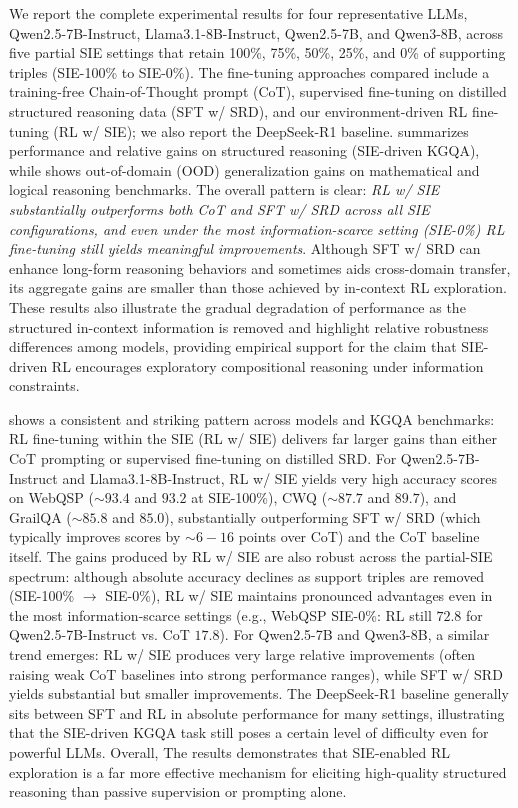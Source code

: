\documentclass{article} %
\begin{document}
\label{appdx:b}
We report the complete experimental results for four representative LLMs, Qwen2.5-7B-Instruct, Llama3.1-8B-Instruct, Qwen2.5-7B, and Qwen3-8B, across five partial SIE settings that retain 100\%, 75\%, 50\%, 25\%, and 0\% of supporting triples (SIE-100\% to SIE-0\%). The fine-tuning approaches compared include a training-free Chain-of-Thought prompt (CoT), supervised fine-tuning on distilled structured reasoning data (SFT w/ SRD), and our environment-driven RL fine-tuning (RL w/ SIE); we also report the DeepSeek-R1 baseline.  summarizes performance and relative gains on structured reasoning (SIE-driven KGQA), while  shows out-of-domain (OOD) generalization gains on mathematical and logical reasoning benchmarks. The overall pattern is clear: \textit{RL w/ SIE substantially outperforms both CoT and SFT w/ SRD across all SIE configurations, and even under the most information-scarce setting (SIE-0\%) RL fine-tuning still yields meaningful improvements}. Although SFT w/ SRD can enhance long-form reasoning behaviors and sometimes aids cross-domain transfer, its aggregate gains are smaller than those achieved by in-context RL exploration. These results also illustrate the gradual degradation of performance as the structured in-context information is removed and highlight relative robustness differences among models, providing empirical support for the claim that SIE-driven RL encourages exploratory compositional reasoning under information constraints.

 shows a consistent and striking pattern across models and KGQA benchmarks: RL fine-tuning within the SIE (RL w/ SIE) delivers far larger gains than either CoT prompting or supervised fine-tuning on distilled SRD. For Qwen2.5-7B-Instruct and Llama3.1-8B-Instruct, RL w/ SIE yields very high accuracy scores on WebQSP ($\sim 93.4$ and $93.2$ at SIE-100\%), CWQ ($\sim 87.7$ and $89.7$), and GrailQA ($\sim 85.8$ and $85.0$), substantially outperforming SFT w/ SRD (which typically improves scores by $\sim 6-16$ points over CoT) and the CoT baseline itself. The gains produced by RL w/ SIE are also robust across the partial-SIE spectrum: although absolute accuracy declines as support triples are removed (SIE-100\% $\rightarrow$ SIE-0\%), RL w/ SIE maintains pronounced advantages even in the most information-scarce settings (e.g., WebQSP SIE-0\%: RL still $72.8$ for Qwen2.5-7B-Instruct vs. CoT $17.8$). For Qwen2.5-7B and Qwen3-8B, a similar trend emerges: RL w/ SIE produces very large relative improvements (often raising weak CoT baselines into strong performance ranges), while SFT w/ SRD yields substantial but smaller improvements. The DeepSeek-R1 baseline generally sits between SFT and RL in absolute performance for many settings, illustrating that the SIE-driven KGQA task still poses a certain level of difficulty even for powerful LLMs. Overall, The results demonstrates that SIE-enabled RL exploration is a far more effective mechanism for eliciting high-quality structured reasoning than passive supervision or prompting alone.
\end{document}
